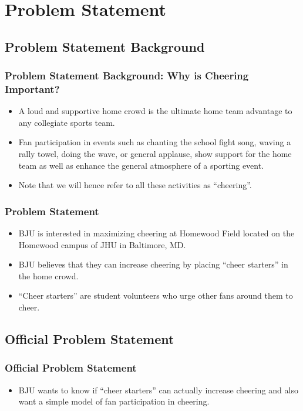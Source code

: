 \documentclass[compress,handout,10pt]{beamer}
\let\olditem\item
\renewcommand{\item}{\setlength{\itemsep}{0.5\baselineskip}\olditem}
\begin{document}
\section{Problem Statement}

\subsection{Problem Statement Background}

\begin{frame}
	\frametitle{Problem Statement Background: Why is Cheering Important?}
		\begin{itemize}
			\item A loud and supportive home crowd is the ultimate home team advantage to any collegiate sports team. 
			\item Fan participation in events such as chanting the school fight song, waving a rally towel, doing the wave, or general applause, show support for the home team as well as enhance the general atmosphere of a sporting event. 
			\item Note that we will hence refer to all these activities as ``cheering''.
		\end{itemize}
\end{frame}

\begin{frame}
	\frametitle{Problem Statement}
			\begin {itemize}
				\item BJU is interested in maximizing cheering at Homewood Field located on the Homewood campus of JHU in Baltimore, MD. 
				\item BJU believes that they can increase cheering by placing ``cheer starters'' in the home crowd.
				\item ``Cheer starters'' are student volunteers who urge other fans around them to cheer. 
			\end {itemize}
\end{frame}

\subsection{Official Problem Statement}

\begin{frame}
	\frametitle{Official Problem Statement}
	\begin{itemize}
		\item BJU wants to know if ``cheer starters'' can actually increase cheering and also want a simple model of fan participation in cheering.
	\end{itemize}
\end{frame}
\end{document}
